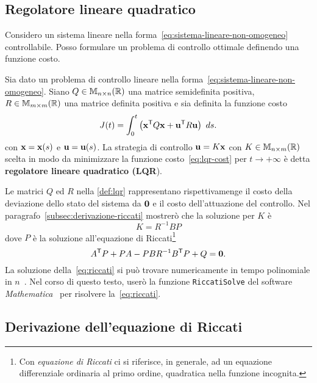 \subsection{Regolatore lineare quadratico}
Considero un sistema lineare nella forma~\eqref{eq:sistema-lineare-non-omogeneo} controllabile.
Posso formulare un problema di controllo ottimale definendo una funzione costo.
\begin{definition}
    Sia dato un problema di controllo lineare nella forma~\eqref{eq:sistema-lineare-non-omogeneo}.
    Siano $Q \in \mathbb{M}_{n\times n}(\mathbb{R})$ una matrice semidefinita positiva, $R \in \mathbb{M}_{m\times m}(\mathbb{R})$ una matrice definita positiva
    e sia definita la funzione costo
    \begin{equation}
        J(t) = \int_0^t
            \left( \mathbf{x}^{\mathsf{T}} Q \mathbf{x} + \mathbf{u}^{\mathsf{T}} R \mathbf{u} \right)
        \ ds.
        \label{eq:lqr-cost}
    \end{equation}
    con $\mathbf{x} = \mathbf{x}(s)$ e $\mathbf{u} = \mathbf{u}(s)$.
    La strategia di controllo $\mathbf{u} = K\mathbf{x}$ con $K \in \mathbb{M}_{n\times m}(\mathbb{R})$ scelta in modo da
    minimizzare la funzione costo~\eqref{eq:lqr-cost} per $t \to +\infty$ è
    detta \textbf{regolatore lineare quadratico (\textsc{LQR}}).
    \label{def:lqr}
\end{definition}
Le matrici $Q$ ed $R$ nella \autoref{def:lqr} rappresentano rispettivamenge
il costo della deviazione dello stato del sistema da $\mathbf{0}$ e il costo dell'attuazione del
controllo.
Nel paragrafo~\ref{subsec:derivazione-riccati} mostrerò che la soluzione per $K$ è
\begin{equation}
    K = R^{-1}BP
    \label{eq:riccati-K}
\end{equation}
dove $P$ è la soluzione all'equazione di Riccati\footnote{Con \emph{equazione di Riccati} ci
si riferisce, in generale, ad un equazione differenziale ordinaria al primo ordine, quadratica nella funzione incognita.}
\begin{equation}
        A^{\mathsf{T}} P + P A - P B R^{-1} B^{\mathsf{T}} P + Q = \mathbf{0}.
    \label{eq:riccati}
\end{equation}
La soluzione della~\eqref{eq:riccati} si può trovare numericamente in tempo polinomiale
in $n$~\cite{riccatiO3}.
Nel corso di questo testo, userò la funzione \verb|RiccatiSolve| del software
\emph{Mathematica}~\cite{Mathematica} per risolvere la~\eqref{eq:riccati}.

\subsection{Derivazione dell'equazione di Riccati}

